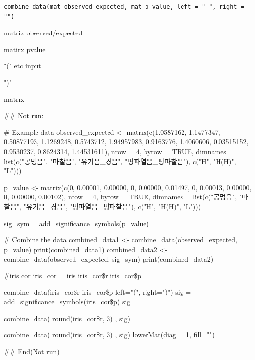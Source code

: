 \documentclass[a4paper]{book}
\begin{document}
%
\begin{Usage}
\begin{verbatim}
combine_data(mat_observed_expected, mat_p_value, left = " ", right = "")
\end{verbatim}
\end{Usage}
%
\begin{Arguments}
\begin{ldescription}
\item[\code{mat\_observed\_expected}] matrix  observed/expected

\item[\code{mat\_p\_value}] matirx pvalue

\item[\code{left}] "(" etc input

\item[\code{right}] ")"
\end{ldescription}
\end{Arguments}
%
\begin{Value}
matrix


## Not run: 

\# Example data
observed\_expected <- matrix(c(1.0587162, 1.1477347, 0.50877193,
                              1.1269248, 0.5743712, 1.94957983,
                              0.9163776, 1.4060606, 0.03515152,
                              0.9530237, 0.8624314, 1.44531611),
                            nrow = 4, byrow = TRUE,
         dimnames = list(c("공명음", "마찰음", "유기음\_경음", "평파열음\_평파찰음"),
                           c("H", "H(H)", "L")))

p\_value <- matrix(c(0, 0.00001, 0.00000,
                    0, 0.00000, 0.01497,
                    0, 0.00013, 0.00000,
                    0, 0.00000, 0.00102),
                  nrow = 4, byrow = TRUE,
       dimnames = list(c("공명음", "마찰음", "유기음\_경음", "평파열음\_평파찰음"),
                      c("H", "H(H)", "L")))

sig\_sym = add\_significance\_symbols(p\_value)

\# Combine the data
combined\_data1 <- combine\_data(observed\_expected, p\_value)
 print(combined\_data1)
combined\_data2 <- combine\_data(observed\_expected, sig\_sym)
 print(combined\_data2)

\#iris cor
iris\_cor = iris 
iris\_cor\$r
iris\_cor\$p

combine\_data(iris\_cor\$r
             iris\_cor\$p
             left="(", right=")")
 sig = add\_significance\_symbols(iris\_cor\$p)
 sig

 combine\_data( round(iris\_cor\$r, 3) , sig)

 combine\_data( round(iris\_cor\$r, 3) , sig) 
 lowerMat(diag = 1, fill="")

## End(Not run)
\end{Value}
\end{document}
